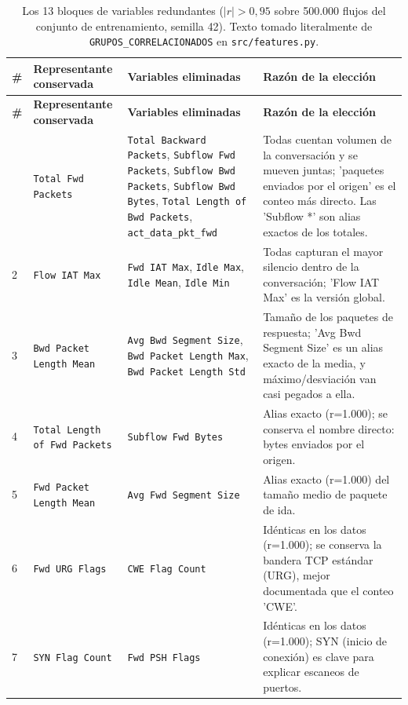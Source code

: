 \begin{longtable}{C{0.6cm} L{3.0cm} L{4.2cm} L{6.3cm}}
\caption{Los 13 bloques de variables redundantes ($|r| > 0{,}95$ sobre 500.000 flujos del conjunto de entrenamiento, semilla 42). Texto tomado literalmente de \texttt{GRUPOS\_CORRELACIONADOS} en \texttt{src/features.py}.}\label{tab:bloques}\\
\toprule
\textbf{\#} & \textbf{Representante conservada} & \textbf{Variables eliminadas} & \textbf{Razón de la elección} \\
\midrule
\endfirsthead
\toprule
\textbf{\#} & \textbf{Representante conservada} & \textbf{Variables eliminadas} & \textbf{Razón de la elección} \\
\midrule
\endhead
\bottomrule
{} & \texttt{Total Fwd Packets} & \texttt{Total Backward Packets}, \texttt{Subflow Fwd Packets}, \texttt{Subflow Bwd Packets}, \texttt{Subflow Bwd Bytes}, \texttt{Total Length of Bwd Packets}, \texttt{act\_data\_pkt\_fwd} & Todas cuentan volumen de la conversación y se mueven juntas; 'paquetes enviados por el origen' es el conteo más directo. Las 'Subflow *' son alias exactos de los totales. \\
2 & \texttt{Flow IAT Max} & \texttt{Fwd IAT Max}, \texttt{Idle Max}, \texttt{Idle Mean}, \texttt{Idle Min} & Todas capturan el mayor silencio dentro de la conversación; 'Flow IAT Max' es la versión global. \\
3 & \texttt{Bwd Packet Length Mean} & \texttt{Avg Bwd Segment Size}, \texttt{Bwd Packet Length Max}, \texttt{Bwd Packet Length Std} & Tamaño de los paquetes de respuesta; 'Avg Bwd Segment Size' es un alias exacto de la media, y máximo/desviación van casi pegados a ella. \\
4 & \texttt{Total Length of Fwd Packets} & \texttt{Subflow Fwd Bytes} & Alias exacto (r=1.000); se conserva el nombre directo: bytes enviados por el origen. \\
5 & \texttt{Fwd Packet Length Mean} & \texttt{Avg Fwd Segment Size} & Alias exacto (r=1.000) del tamaño medio de paquete de ida. \\
6 & \texttt{Fwd URG Flags} & \texttt{CWE Flag Count} & Idénticas en los datos (r=1.000); se conserva la bandera TCP estándar (URG), mejor documentada que el conteo 'CWE'. \\
7 & \texttt{SYN Flag Count} & \texttt{Fwd PSH Flags} & Idénticas en los datos (r=1.000); SYN (inicio de conexión) es clave para explicar escaneos de puertos. \\

\end{longtable}
